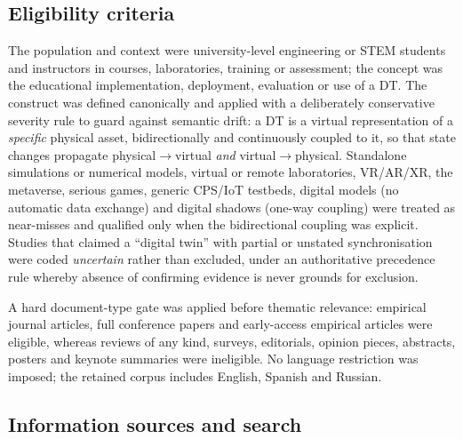\subsection{Eligibility criteria}\label{eligibility-criteria}

The population and context were university-level engineering or STEM students and
instructors in courses, laboratories, training or assessment; the concept was the
educational implementation, deployment, evaluation or use of a DT. The construct
was defined canonically and applied with a deliberately conservative severity rule
to guard against semantic drift: a DT is a virtual representation of a \emph{specific}
physical asset, bidirectionally and continuously coupled to it, so that state
changes propagate physical\ensuremath{\rightarrow}virtual \emph{and} virtual\ensuremath{\rightarrow}physical. Standalone simulations
or numerical models, virtual or remote laboratories, VR/AR/XR, the metaverse,
serious games, generic CPS/IoT testbeds, digital models (no automatic data
exchange) and digital shadows (one-way coupling) were treated as near-misses and
qualified only when the bidirectional coupling was explicit. Studies that claimed
a ``digital twin'' with partial or unstated synchronisation were coded \emph{uncertain}
rather than excluded, under an authoritative precedence rule whereby absence of
confirming evidence is never grounds for exclusion.

A hard document-type gate was applied before thematic relevance: empirical journal
articles, full conference papers and early-access empirical articles were
eligible, whereas reviews of any kind, surveys, editorials, opinion pieces,
abstracts, posters and keynote summaries were ineligible. No language restriction
was imposed; the retained corpus includes English, Spanish and Russian.

\subsection{Information sources and search}\label{information-sources-and-search}

